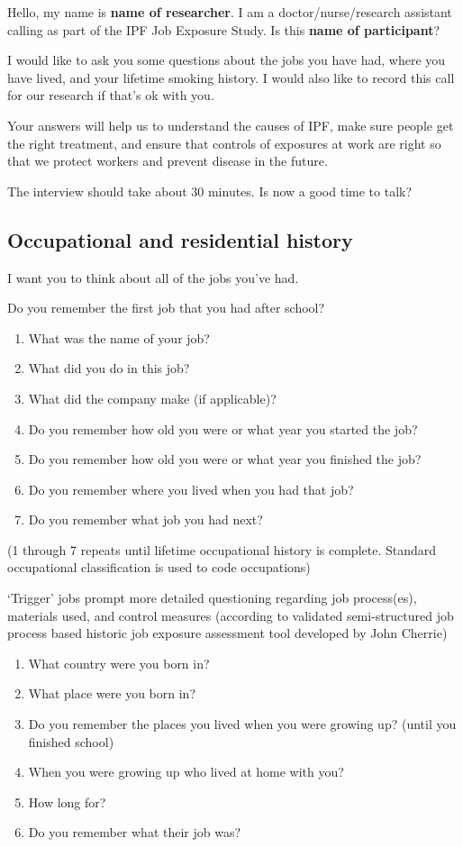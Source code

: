 \documentclass[a4paper,10pt]{article}
\begin{document}
Hello, my name is \textbf{name of researcher}. I am a doctor/nurse/research assistant calling as part of the IPF Job Exposure Study. Is this \textbf{name of participant}? 

I would like to ask you some questions about the jobs you have had, where you have lived, and your lifetime smoking history. I would also like to record this call for our research if that's ok with you.  

Your answers will help us to understand the causes of IPF, make sure people get the right treatment, and ensure that controls of exposures at work are right so that we protect workers and prevent disease in the future.  

The interview should take about 30 minutes. Is now a good time to talk?

\subsection{Occupational and residential history} 

I want you to think about all of the jobs you've had. 

Do you remember the first job that you had after school?

\begin{enumerate}
\item  What was the name of your job?
\item  What did you do in this job?
\item  What did the company make (if applicable)?
\item  Do you remember how old you were or what year you started the job?
\item  Do you remember how old you were or what year you finished the job?
\item  Do you remember where you lived when you had that job?
\item  Do you remember what job you had next?
\end{enumerate}

(1 through 7 repeats until lifetime occupational history is complete. Standard occupational classification is used to code occupations)

`Trigger' jobs prompt more detailed questioning regarding job process(es), materials used, and control measures (according to validated semi-structured job process based historic job exposure assessment tool developed by John Cherrie)

\begin{enumerate}[resume]
\item What country were you born in? 
\item What place were you born in?
\item Do you remember the places you lived when you were growing up? (until you finished school) 
\item When you were growing up who lived at home with you?
\item How long for?
\item Do you remember what their job was?
\end{enumerate}
\end{document}
